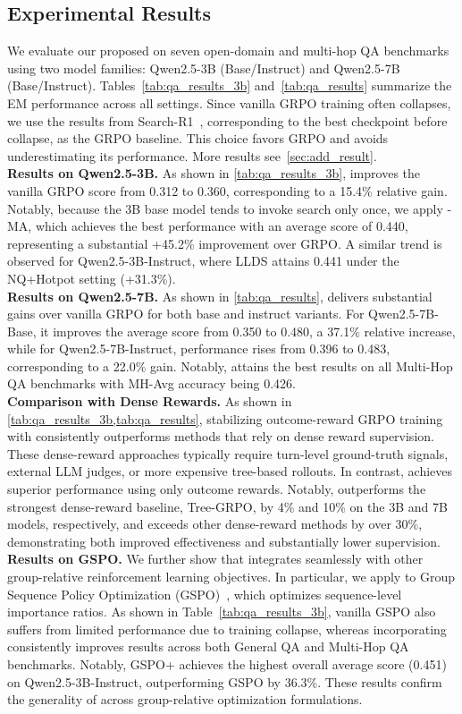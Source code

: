 \subsection{Experimental Results}\label{sec:reuslt}
We evaluate our proposed \ours{} on seven open-domain and multi-hop QA benchmarks using two model families: Qwen2.5-3B (Base/Instruct) and Qwen2.5-7B (Base/Instruct). Tables~\ref{tab:qa_results_3b} and~\ref{tab:qa_results} summarize the EM performance across all settings. Since vanilla GRPO training often collapses, we use the results from Search-R1~\cite{jin2025search}, corresponding to the best checkpoint before collapse, as the GRPO baseline. This choice favors GRPO and avoids underestimating its performance. More results see~\cref{sec:add_result}.
\\
\textbf{Results on Qwen2.5-3B.} As shown in \cref{tab:qa_results_3b}, \ours{} improves the vanilla GRPO score from 0.312 to 0.360, corresponding to a 15.4\% relative gain. Notably, because the 3B base model tends to invoke search only once, we apply \ours{}-MA, which achieves the best performance with an average score of 0.440, representing a substantial +45.2\% improvement over GRPO. A similar trend is observed for Qwen2.5-3B-Instruct, where LLDS attains 0.441 under the NQ+Hotpot setting (+31.3\%).
\\
\textbf{Results on Qwen2.5-7B.}
As shown in \cref{tab:qa_results}, \ours{} delivers substantial gains over vanilla GRPO for both base and instruct variants. For Qwen2.5-7B-Base, it improves the average score from 0.350 to 0.480, a 37.1\% relative increase, while for Qwen2.5-7B-Instruct, performance rises from 0.396 to 0.483, corresponding to a 22.0\% gain. Notably, \ours{} attains the best results on all Multi-Hop QA benchmarks with MH-Avg accuracy being 0.426.
\\
\textbf{Comparison with Dense Rewards.}
As shown in \cref{tab:qa_results_3b,tab:qa_results}, stabilizing outcome-reward GRPO training with \ours{} consistently outperforms methods that rely on dense reward supervision. These dense-reward approaches typically require turn-level ground-truth signals, external LLM judges, or more expensive tree-based rollouts. In contrast, \ours{} achieves superior performance using only outcome rewards. Notably, \ours{} outperforms the strongest dense-reward baseline, Tree-GRPO, by 4\% and 10\% on the 3B and 7B models, respectively, and exceeds other dense-reward methods by over 30\%, demonstrating both improved effectiveness and substantially lower supervision.
\\ 
\textbf{Results on GSPO.} We further show that \ours{} integrates seamlessly with other group-relative reinforcement learning objectives. In particular, we apply \ours{} to Group Sequence Policy Optimization (GSPO)~\citep{zheng2025group}, which optimizes sequence-level importance ratios. As shown in Table~\ref{tab:qa_results_3b}, vanilla GSPO also suffers from limited performance due to training collapse, whereas incorporating \ours{} consistently improves results across both General QA and Multi-Hop QA benchmarks. Notably, GSPO+\ours{} achieves the highest overall average score (0.451) on Qwen2.5-3B-Instruct, outperforming GSPO by 36.3\%. These results confirm the generality of \ours{} across group-relative optimization formulations.
